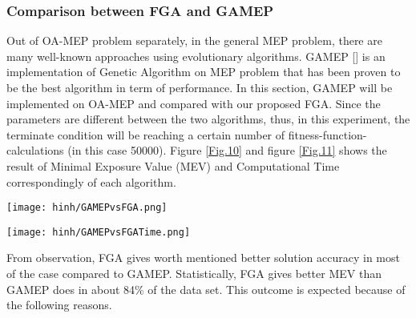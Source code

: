 \documentclass[final]{elsarticle}
\begin{document}
\subsubsection{Comparison between FGA and GAMEP}
Out of OA-MEP problem separately, in the general MEP problem, there are many well-known approaches using evolutionary algorithms. GAMEP [] is an implementation of Genetic Algorithm on MEP problem that has been proven to be the best algorithm in term of performance. In this section, GAMEP will be implemented on OA-MEP and compared with our proposed FGA. Since the parameters are different between the two algorithms, thus, in this experiment, the terminate condition will be reaching a certain number of fitness-function-calculations (in this case 50000). Figure \ref{Fig.10} and figure \ref{Fig.11} shows the result of Minimal Exposure Value (MEV) and Computational Time correspondingly of each algorithm.
\begin{figure*}[h]
	\texttt{[image: hinh/GAMEPvsFGA.png]}
	\centering
	\caption{The Minimal Exposure Value comparison between FGA and GAMEP on some noble topologies
	}
	\label{Fig.10}       %
\end{figure*}
\begin{figure*}[h]
	\texttt{[image: hinh/GAMEPvsFGATime.png]}
	\centering
	\caption{The Computational Time (sec) comparison between FGA and GAMEP on some noble topologies
	}
	\label{Fig.11}       %
\end{figure*}
From observation, FGA gives worth mentioned better solution accuracy in most of the case compared to GAMEP. Statistically, FGA gives better MEV than GAMEP does in about 84\% of the data set. This outcome is expected because of  the following reasons.
\end{document}

